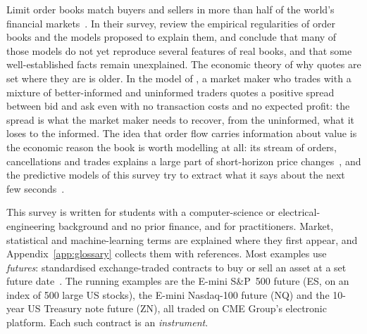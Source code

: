 Limit order books match buyers and sellers in more than half of the world's financial
markets~\citep{gould2013}. In their survey, \citet{gould2013} review the empirical regularities of order
books and the models proposed to explain them, and conclude that many of those models do not yet reproduce
several features of real books, and that some well-established facts remain unexplained. The economic theory of why
quotes are set where they are is older. In the model of \citet{glosten1985}, a market maker who trades
with a mixture of better-informed and uninformed traders quotes a positive spread between bid and ask even
with no transaction costs and no expected profit: the spread is what the market maker needs to recover,
from the uninformed, what it loses to the informed. The idea that order flow carries information about
value is the economic reason the book is worth modelling at all: its stream of orders, cancellations and
trades explains a large part of short-horizon price
changes~\citep{cks2014}, and the predictive models of this survey try to extract what it says about the
next few seconds~\citep{sirignano2019,zhang2019,lucchese2024}.

This survey is written for students with a computer-science or electrical-engineering background
and no prior finance, and for practitioners. Market, statistical and machine-learning terms are explained where they first
appear, and Appendix~\ref{app:glossary} collects them with references. Most examples use
\emph{futures}: standardised exchange-traded contracts to buy or sell an asset at a set future
date~\citep{hull}. The running examples are the E-mini S\&P~500 future (ES, on an index of 500
large US stocks), the E-mini Nasdaq-100 future (NQ) and the 10-year US Treasury note future (ZN),
all traded on CME Group's electronic platform. Each such contract is an \emph{instrument}.


